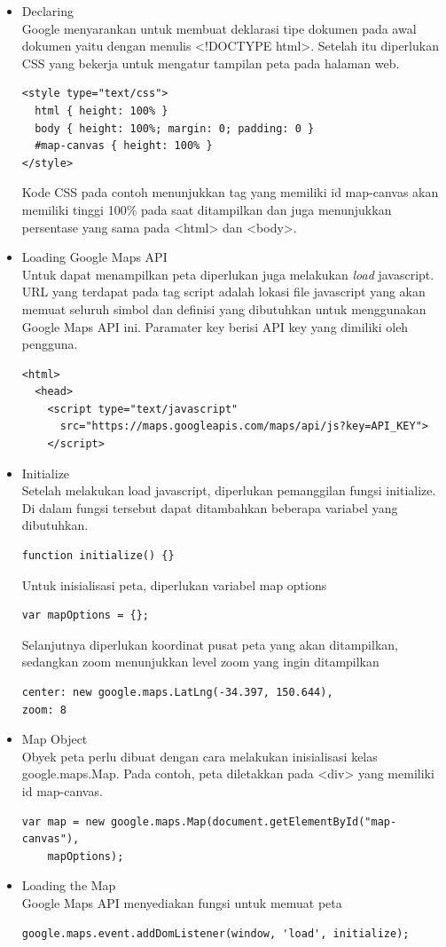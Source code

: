 \begin{itemize}
\item Declaring \\
Google menyarankan untuk membuat deklarasi tipe dokumen pada awal dokumen yaitu
dengan menulis <!DOCTYPE html>. Setelah itu diperlukan CSS yang bekerja untuk
mengatur tampilan peta pada halaman web.
\begin{verbatim}
<style type="text/css">
  html { height: 100% }
  body { height: 100%; margin: 0; padding: 0 }
  #map-canvas { height: 100% }
</style>
\end{verbatim}
Kode CSS pada contoh menunjukkan tag yang memiliki id map-canvas akan memiliki
tinggi 100\% pada saat ditampilkan dan juga menunjukkan persentase yang sama
pada <html> dan <body>.

\item Loading Google Maps API\\
Untuk dapat menampilkan peta diperlukan juga melakukan \textit{load} javascript.
URL yang terdapat pada tag script adalah lokasi file javascript yang akan memuat
seluruh simbol dan definisi yang dibutuhkan untuk menggunakan Google Maps API
ini. Paramater key berisi API key yang dimiliki oleh pengguna.
\begin{verbatim}
<html>
  <head>
    <script type="text/javascript"
      src="https://maps.googleapis.com/maps/api/js?key=API_KEY">
    </script>
\end{verbatim}

\item Initialize \\
Setelah melakukan load javascript, diperlukan pemanggilan fungsi initialize. Di
dalam fungsi tersebut dapat ditambahkan beberapa variabel yang dibutuhkan.
\begin{verbatim}
function initialize() {}
\end{verbatim}
Untuk inisialisasi peta, diperlukan variabel map options
\begin{verbatim}
var mapOptions = {};
\end{verbatim}
Selanjutnya diperlukan koordinat pusat peta yang akan ditampilkan, sedangkan
zoom menunjukkan level zoom yang ingin ditampilkan
\begin{verbatim}
center: new google.maps.LatLng(-34.397, 150.644),
zoom: 8
\end{verbatim}

\item Map Object \\
Obyek peta perlu dibuat dengan cara melakukan inisialisasi kelas
google.maps.Map. Pada contoh, peta diletakkan pada <div> yang memiliki id
map-canvas.
\begin{verbatim}
var map = new google.maps.Map(document.getElementById("map-canvas"),
    mapOptions);
\end{verbatim}

\item Loading the Map \\
Google Maps API menyediakan fungsi untuk memuat peta 
\begin{verbatim}
google.maps.event.addDomListener(window, 'load', initialize);
\end{verbatim}
\end{itemize}

